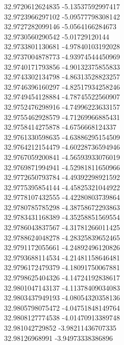 {32.9720612624835	-5.13537592997417\\
32.9723966297102	-5.09577798308142\\
32.9727282099146	-5.0564166284673\\
32.9730560290542	-5.01729120144\\
32.9733801130681	-4.97840103192028\\
32.9737004878773	-4.93974544450969\\
32.9740171793856	-4.90132375855833\\
32.9743302134798	-4.86313528823257\\
32.9746396160297	-4.82517934258246\\
32.9749454128884	-4.78745522560907\\
32.9752476298916	-4.74996223633157\\
32.9755462928579	-4.71269966885431\\
32.9758414275878	-4.6756668124337\\
32.9761330598635	-4.63886295154509\\
32.9764212154479	-4.60228736594946\\
32.9767059200841	-4.56593933076019\\
32.9769871994941	-4.52981811650966\\
32.9772650793784	-4.49392298921592\\
32.9775395854144	-4.45825321044922\\
32.9778107432555	-4.42280803739864\\
32.9780785785298	-4.38758672293863\\
32.9783431168389	-4.35258851569554\\
32.9786043837567	-4.31781266011425\\
32.9788624048278	-4.28325839652465\\
32.9791172055661	-4.24892496120826\\
32.9793688114534	-4.21481158646481\\
32.9796172479379	-4.18091750067881\\
32.9798625404326	-4.14724192838617\\
32.9801047143137	-4.11378409034083\\
32.9803437949193	-4.08054320358136\\
32.9805798075472	-4.04751848149764\\
32.9808127774538	-4.01470913389748\\
32.981042729852	-3.98211436707335\\
32.98126968991	-3.94973338386896\\
}
